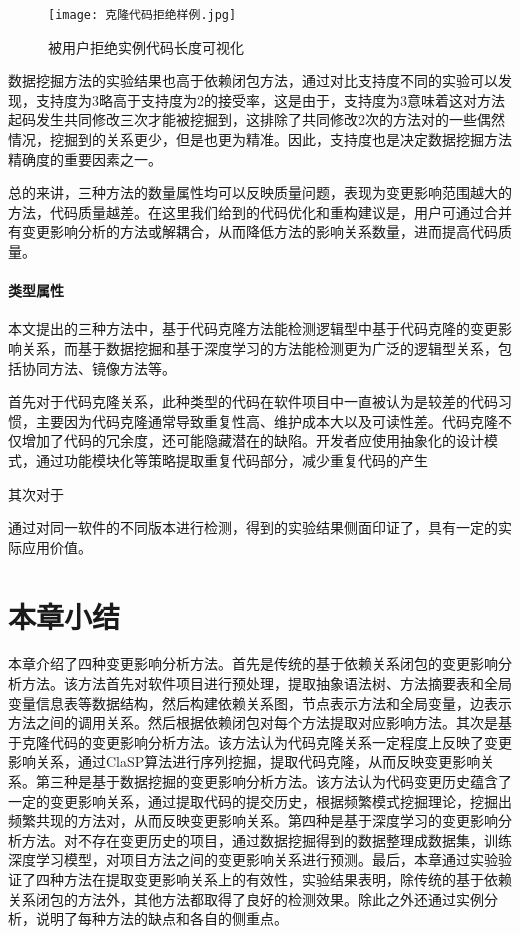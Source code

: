 \begin{figure}[h]
\centering
\texttt{[image: 克隆代码拒绝样例.jpg]}
\caption{被用户拒绝实例代码长度可视化}
\end{figure}

数据挖掘方法的实验结果也高于依赖闭包方法，通过对比支持度不同的实验可以发现，支持度为3略高于支持度为2的接受率，这是由于，支持度为3意味着这对方法起码发生共同修改三次才能被挖掘到，这排除了共同修改2次的方法对的一些偶然情况，挖掘到的关系更少，但是也更为精准。因此，支持度也是决定数据挖掘方法精确度的重要因素之一。

总的来讲，三种方法的数量属性均可以反映质量问题，表现为变更影响范围越大的方法，代码质量越差。在这里我们给到的代码优化和重构建议是，用户可通过合并有变更影响分析的方法或解耦合，从而降低方法的影响关系数量，进而提高代码质量。


\paragraph{类型属性} 本文提出的三种方法中，基于代码克隆方法能检测逻辑型中基于代码克隆的变更影响关系，而基于数据挖掘和基于深度学习的方法能检测更为广泛的逻辑型关系，包括协同方法、镜像方法等。

首先对于代码克隆关系，此种类型的代码在软件项目中一直被认为是较差的代码习惯，主要因为代码克隆通常导致重复性高、维护成本大以及可读性差。代码克隆不仅增加了代码的冗余度，还可能隐藏潜在的缺陷。开发者应使用抽象化的设计模式，通过功能模块化等策略提取重复代码部分，减少重复代码的产生

其次对于


通过对同一软件的不同版本进行检测，得到的实验结果侧面印证了，具有一定的实际应用价值。

\section{本章小结}

本章介绍了四种变更影响分析方法。首先是传统的基于依赖关系闭包的变更影响分析方法。该方法首先对软件项目进行预处理，提取抽象语法树、方法摘要表和全局变量信息表等数据结构，然后构建依赖关系图，节点表示方法和全局变量，边表示方法之间的调用关系。然后根据依赖闭包对每个方法提取对应影响方法。其次是基于克隆代码的变更影响分析方法。该方法认为代码克隆关系一定程度上反映了变更影响关系，通过ClaSP算法进行序列挖掘，提取代码克隆，从而反映变更影响关系。第三种是基于数据挖掘的变更影响分析方法。该方法认为代码变更历史蕴含了一定的变更影响关系，通过提取代码的提交历史，根据频繁模式挖掘理论，挖掘出频繁共现的方法对，从而反映变更影响关系。第四种是基于深度学习的变更影响分析方法。对不存在变更历史的项目，通过数据挖掘得到的数据整理成数据集，训练深度学习模型，对项目方法之间的变更影响关系进行预测。最后，本章通过实验验证了四种方法在提取变更影响关系上的有效性，实验结果表明，除传统的基于依赖关系闭包的方法外，其他方法都取得了良好的检测效果。除此之外还通过实例分析，说明了每种方法的缺点和各自的侧重点。


